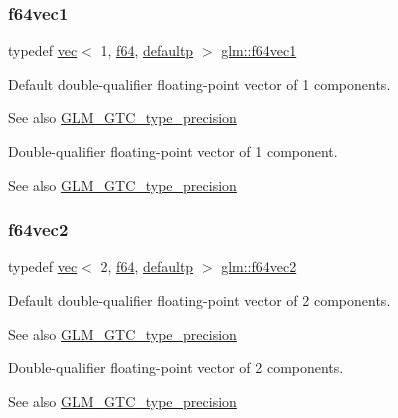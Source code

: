 \subsubsection{\texorpdfstring{f64vec1}{f64vec1}}
{\footnotesize\ttfamily typedef \hyperlink{structglm_1_1vec}{vec}$<$ 1, \hyperlink{group__gtc__type__precision_ga2bba392e555124b36cde6abba349bab3}{f64}, \hyperlink{namespaceglm_a36ed105b07c7746804d7fdc7cc90ff25a9d21ccd8b5a009ec7eb7677befc3bf51}{defaultp} $>$ \hyperlink{group__gtc__type__precision_ga6478d0530433bb907956a46b2cd99161}{glm\+::f64vec1}}

Default double-\/qualifier floating-\/point vector of 1 components. \begin{DoxySeeAlso}{See also}
\hyperlink{group__gtc__type__precision}{G\+L\+M\+\_\+\+G\+T\+C\+\_\+type\+\_\+precision}
\end{DoxySeeAlso}
Double-\/qualifier floating-\/point vector of 1 component. \begin{DoxySeeAlso}{See also}
\hyperlink{group__gtc__type__precision}{G\+L\+M\+\_\+\+G\+T\+C\+\_\+type\+\_\+precision} 
\end{DoxySeeAlso}
\mbox{\label{group__gtc__type__precision_ga6c794781267fd5c810d9a6e7086e02a6}} 
\subsubsection{\texorpdfstring{f64vec2}{f64vec2}}
{\footnotesize\ttfamily typedef \hyperlink{structglm_1_1vec}{vec}$<$ 2, \hyperlink{group__gtc__type__precision_ga2bba392e555124b36cde6abba349bab3}{f64}, \hyperlink{namespaceglm_a36ed105b07c7746804d7fdc7cc90ff25a9d21ccd8b5a009ec7eb7677befc3bf51}{defaultp} $>$ \hyperlink{group__gtc__type__precision_ga6c794781267fd5c810d9a6e7086e02a6}{glm\+::f64vec2}}

Default double-\/qualifier floating-\/point vector of 2 components. \begin{DoxySeeAlso}{See also}
\hyperlink{group__gtc__type__precision}{G\+L\+M\+\_\+\+G\+T\+C\+\_\+type\+\_\+precision}
\end{DoxySeeAlso}
Double-\/qualifier floating-\/point vector of 2 components. \begin{DoxySeeAlso}{See also}
\hyperlink{group__gtc__type__precision}{G\+L\+M\+\_\+\+G\+T\+C\+\_\+type\+\_\+precision} 
\end{DoxySeeAlso}
\mbox{\label{group__gtc__type__precision_ga659b65d8792f93da76c2da44f06e0b8b}} 
